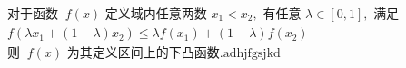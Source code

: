 \documentclass[preview]{standalone}
\begin{document}
\begin{align*}
& \text{对于函数 }\ f(x) \text{ 定义域内任意两数 } x_1 < x_2, \text{ 有任意 } \lambda \in [0, 1], \text{ 满足} \\ & f(\lambda x_1 + (1 - \lambda) x_2) \leq \lambda f(x_1) + (1 - \lambda) f(x_2) \\ & \text{则 }\ f(x) \text{ 为其定义区间上的下凸函数.adhjfgsjkd}
\end{align*}
\end{document}
